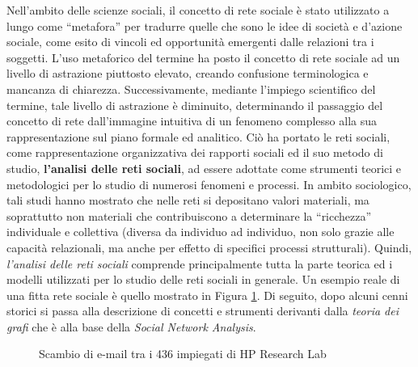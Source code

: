 Nell'ambito delle scienze sociali, il concetto di rete sociale è stato utilizzato a lungo come ``metafora'' per tradurre quelle che sono le idee di società e d'azione sociale, come esito di vincoli ed opportunità emergenti dalle relazioni tra i soggetti. L’uso metaforico del termine ha posto il concetto di rete sociale ad un livello di astrazione piuttosto elevato, creando confusione terminologica e mancanza di chiarezza. Successivamente, mediante l'impiego scientifico del termine, tale livello di astrazione è diminuito, determinando il passaggio del concetto di rete dall'immagine intuitiva di un fenomeno complesso alla sua rappresentazione sul piano formale ed analitico. Ciò ha portato le reti sociali, come rappresentazione organizzativa dei rapporti sociali ed il suo metodo di studio, \textbf{l’analisi delle reti sociali}, ad essere adottate come strumenti teorici e metodologici per lo studio di numerosi fenomeni e processi. In ambito sociologico, tali studi hanno mostrato che nelle reti si depositano valori materiali, ma soprattutto non materiali che contribuiscono a determinare la ``ricchezza'' individuale e collettiva (diversa da individuo ad individuo, non solo grazie alle capacità relazionali, ma anche per effetto di specifici processi strutturali)\cite{pisa}.
Quindi, \textit{l'analisi delle reti sociali} comprende principalmente tutta la parte teorica ed i modelli utilizzati per lo studio delle reti sociali in generale. Un esempio reale di una fitta rete sociale è quello mostrato in Figura \ref{fig:hp}. Di seguito, dopo alcuni cenni storici si passa alla descrizione di concetti e strumenti derivanti dalla \emph{teoria dei grafi} che è alla base della \textit{Social Network Analysis}.
\begin{figure}[ht]
	\centering {}
	\caption{Scambio di e-mail tra i 436 impiegati di HP Research Lab}
	\label{fig:hp}
\end{figure}

